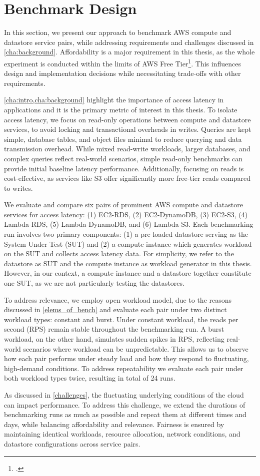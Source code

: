 \section{Benchmark Design}
\label{cha:approach}

In this section, we present our approach to benchmark AWS compute and datastore service pairs, while addressing requirements and challenges discussed in \cref{cha:background}. Affordability is a major requirement in this thesis, as the whole experiment is conducted within the limits of AWS Free Tier\footcite{https://aws.amazon.com/free/}. This influences design and implementation decisions while necessitating trade-offs with other requirements.

\cref{cha:intro,cha:background} highlight the importance of access latency in applications and it is the primary metric of interest in this thesis. To isolate access latency, we focus on read-only operations between compute and datastore services, to avoid locking and transactional overheads in writes. Queries are kept simple, database tables, and object files minimal to reduce querying and data transmission overhead. While mixed read-write workloads, larger databases, and complex queries reflect real-world scenarios, simple read-only benchmarks can provide initial baseline latency performance. Additionally, focusing on reads is cost-effective, as services like S3 offer significantly more free-tier reads compared to writes.

We evaluate and compare six pairs of prominent AWS compute and datastore services for access latency: (1) EC2-RDS, (2) EC2-DynamoDB, (3) EC2-S3, (4) Lambda-RDS, (5) Lambda-DynamoDB, and (6) Lambda-S3. Each benchmarking run involves two primary components: (1) a pre-loaded datastore serving as the System Under Test (SUT) and (2) a compute instance which generates workload on the SUT and collects access latency data. For simplicity, we refer to the datastore as SUT and the compute instance as workload generator in this thesis. However, in our context, a compute instance and a datastore together constitute one SUT, as we are not particularly testing the datastores.

To address relevance, we employ open workload model, due to the reasons discussed in \cref{elems_of_bench} and evaluate each pair under two distinct workload types: constant and burst. Under constant workload, the reads per second (RPS) remain stable throughout the benchmarking run. A burst workload, on the other hand, simulates sudden spikes in RPS, reflecting real-world scenarios where workload can be unpredictable. This allows us to observe how each pair performs under steady load and how they respond to fluctuating, high-demand conditions. To address repeatability we evaluate each pair under both workload types twice, resulting in total of 24 runs.

As discussed in \cref{challenges}, the fluctuating underlying conditions of the cloud can impact performance. To address this challenge, we extend the durations of benchmarking runs as much as possible and repeat them at different times and days, while balancing affordability and relevance. Fairness is ensured by maintaining identical workloads, resource allocation, network conditions, and datastore configurations across service pairs.
